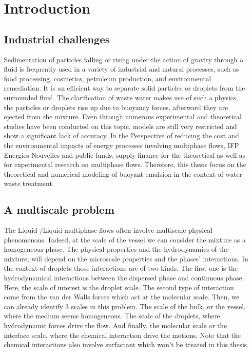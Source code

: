 \chapter{Introduction}
\label{chap:intro}

\section{Industrial challenges} 
Sedimentation of particles falling or rising under the action of gravity through a fluid is frequently used in a variety of industrial and natural processes, such as food processing, cosmetics, petroleum production, and environmental remediation. 
It is an efficient way to separate solid particles or droplets from the surrounded fluid. 
The clarification of waste water makes use of such a physics, the particles or droplets rise up due to buoyancy forces, afterward they are ejected from the mixture.
Even through numerous experimental and theoretical studies have been conducted on this topic, models are still very restricted and show a significant lack of accuracy. 
In the Perspective of reducing the cost and the environmental impacts of energy processes involving multiphase flows, IFP Energies Nouvelles and public funds, supply finance for the theoretical as well as for experimental research on multiphase flows.
Therefore, this thesis focus on the theoretical and numerical modeling of buoyant emulsion in the context of water waste treatment.  


\section{A multiscale problem} 
The Liquid /Liquid multiphase flows often involve multiscale physical phenomenons. 
Indeed, at the scale of the vessel we can consider the mixture as a homogeneous phase.
The physical properties and the hydrodynamics of the mixture, will depend on the microscale properties and the phases' interactions.
In the context of droplets those interactions are of two kinds. 
The first one is the hydrodynamical interactions between the dispersed phase and continuous phase.
Here, the scale of interest is the droplet scale.
The second type of interaction come from the van der Walls forces which act at the molecular scale. 
Then, we can already identify $3$ scales in this problem.
The scale of the bulk, or the vessel, where the medium seems homogeneous. 
The scale of the droplets, where hydrodynamic forces drive the flow. 
And finally, the molecular scale or the interface scale, where the chemical interaction drive the motions. 
Note that the chemical interactions also involve surfactant which won't be treated in this thesis. 

